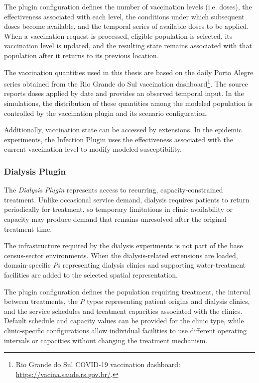 The plugin configuration defines the number of vaccination levels (i.e. doses), the effectiveness associated with each level, the conditions under which subsequent doses become available, and the temporal series of available doses to be applied. When a vaccination request is processed, eligible population is selected, its vaccination level is updated, and the resulting state remains associated with that population after it returns to its previous location.

The vaccination quantities used in this thesis are based on the daily Porto Alegre series obtained from the Rio Grande do Sul vaccination dashboard\footnote{Rio Grande do Sul COVID-19 vaccination dashboard: \url{https://vacina.saude.rs.gov.br/}.}. The source reports doses applied by date and provides an observed temporal input. In the simulations, the distribution of these quantities among the modeled population is controlled by the vaccination plugin and its scenario configuration.

Additionally, vaccination state can be accessed by extensions. In the epidemic experiments, the Infection Plugin uses the effectiveness associated with the current vaccination level to modify modeled susceptibility. %

\subsubsection{Dialysis Plugin}
\label{sec:dialysis_plugin_inputs}

The \textit{Dialysis Plugin} represents access to recurring, capacity-constrained treatment. Unlike occasional service demand, dialysis requires patients to return periodically for treatment, so temporary limitations in clinic availability or capacity may produce demand that remains unresolved after the original treatment time. 

The infrastructure required by the dialysis experiments is not part of the base census-sector environments. When the dialysis-related extensions are loaded, domain-specific $P$s representing dialysis clinics and supporting water-treatment facilities are added to the selected spatial representation.

The plugin configuration defines the population requiring treatment, the interval between treatments, the $P$ types representing patient origins and dialysis clinics, and the service schedules and treatment capacities associated with the clinics. Default schedule and capacity values can be provided for the clinic type, while clinic-specific configurations allow individual facilities to use different operating intervals or capacities without changing the treatment mechanism. 

